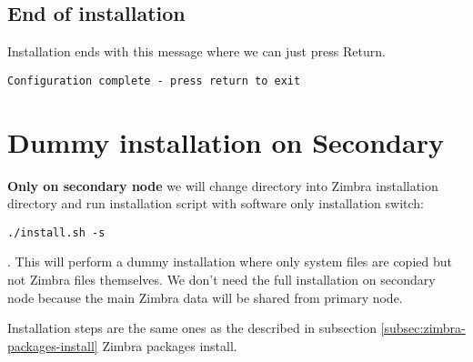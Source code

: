 \subsection {End of installation}
Installation ends with this message where we can just press Return.

\begin{verbatim}
Configuration complete - press return to exit
\end{verbatim}

\section {Dummy installation on Secondary}
\textbf{Only on secondary node} we will change directory into Zimbra installation directory and run installation script with software only installation switch:

\begin{verbatim}
./install.sh -s
\end{verbatim}
. This will perform a dummy installation where only system files are copied but not Zimbra files themselves. We don't need the full installation on secondary node because the main Zimbra data will be shared from primary node.

Installation steps are the same ones as the described in subsection {\ref{subsec:zimbra-packages-install} Zimbra packages install}.
